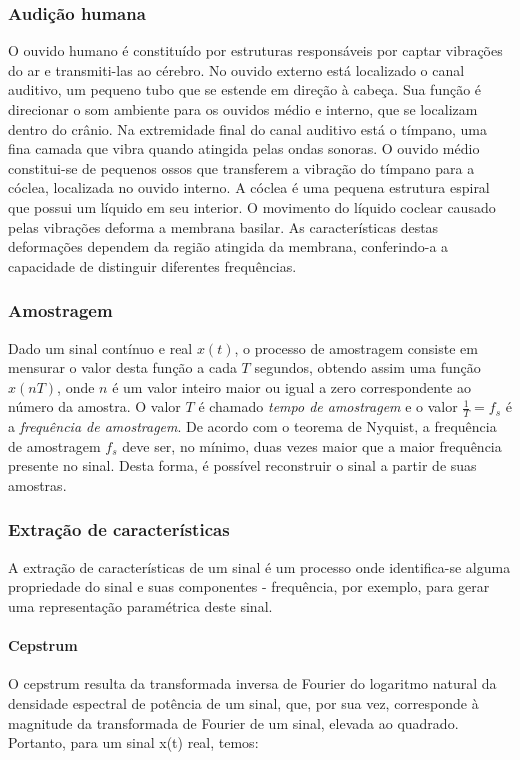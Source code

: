 \documentclass[a4paper, 12pt]{article}
\begin{document}
		\subsubsection{Audição humana}
		O ouvido humano é constituído por estruturas responsáveis por captar vibrações do ar e transmiti-las ao cérebro. 
		No ouvido externo está localizado o canal auditivo, um pequeno tubo que se estende em direção à cabeça. Sua função é direcionar o som ambiente para os ouvidos médio e interno, que se localizam dentro do crânio. Na extremidade final do canal auditivo está o tímpano, uma fina camada que vibra quando atingida pelas ondas sonoras.
		O ouvido médio constitui-se de pequenos ossos que transferem a vibração do tímpano para a cóclea, localizada no ouvido interno.\cite{smith1999dsp} 
		A cóclea é uma pequena estrutura espiral que possui um líquido em seu interior. O movimento do líquido coclear causado pelas vibrações deforma a membrana basilar. As características destas deformações dependem da região atingida da membrana, conferindo-a a capacidade de distinguir diferentes frequências.\cite{purves2001neuroscience}
		
		\subsubsection{Amostragem}
		 Dado um sinal contínuo e real $x(t) $, o processo de amostragem consiste em mensurar o valor desta função a cada $ T $ segundos, obtendo assim uma função $ x(nT) $, onde $ n $ é um valor inteiro maior ou igual a zero correspondente ao número da amostra. O valor $ T $ é chamado \textit{tempo de amostragem} e o valor $ \frac{1}{T} = f_s $ é a \textit{frequência de amostragem}.
		 De acordo com o teorema de Nyquist, a frequência de amostragem $ f_s $ deve ser, no mínimo, duas vezes maior que a maior frequência presente no sinal. Desta forma, é possível reconstruir o sinal a partir de suas amostras.
		 
		\subsubsection{Extração de características}
		A extração de características de um sinal é um processo onde identifica-se alguma propriedade do sinal e suas componentes - frequência, por exemplo, para gerar uma representação paramétrica deste sinal.
	
		\paragraph{Cepstrum}
		O cepstrum resulta da transformada inversa de Fourier do logaritmo natural da densidade espectral de potência de um sinal, que, por sua vez, corresponde à magnitude da transformada de Fourier de um sinal, elevada ao quadrado. Portanto, para um sinal x(t) real, temos:
		
\end{document}
